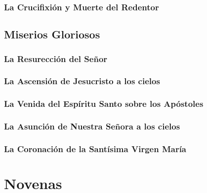 \documentclass[a4paper,11pt, oneside]{report}
\begin{document}
    \subsection{La Crucifixión y Muerte del Redentor}
      

         
  \section{Miserios Gloriosos}
    \subsection{La Resurección del Señor}
      


    \subsection{La Ascensión de Jesucristo a los cielos}
        


    \subsection{La Venida del Espíritu Santo sobre los Apóstoles}



    \subsection{La Asunción de Nuestra Señora a los cielos}



    \subsection{La Coronación de la Santísima Virgen María}

  \chapter{Novenas}
\end{document}
